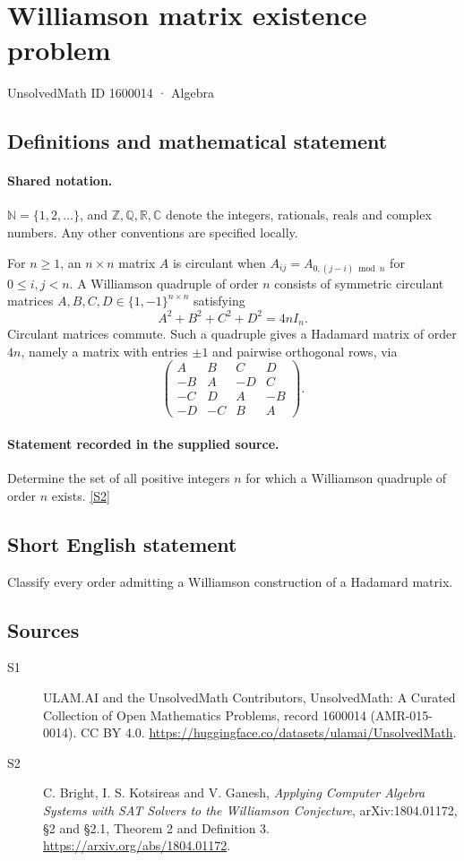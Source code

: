 \documentclass[11pt]{article}
\newcommand{\sref}[2]{\hyperlink{source:#1:#2}{[S#2]}}
\begin{document}
\setcounter{section}{1600013}
\section{Williamson matrix existence problem}\label{1600014}
{\small\sffamily UnsolvedMath ID 1600014 · Algebra}
\subsection{Definitions and mathematical statement}

\paragraph{Shared notation.}$\mathbb N=\{1,2,\ldots\}$, and $\mathbb Z,\mathbb Q,\mathbb R,\mathbb C$ denote the integers, rationals, reals and complex numbers. Any other conventions are specified locally.


For $n\geq1$, an $n\times n$ matrix $A$ is circulant when $A_{ij}=A_{0,(j-i)\bmod n}$ for $0\leq i,j<n$. A Williamson quadruple of order $n$ consists of symmetric circulant matrices $A,B,C,D\in\{1,-1\}^{n\times n}$ satisfying
\[A^2+B^2+C^2+D^2=4nI_n.
\]
Circulant matrices commute. Such a quadruple gives a Hadamard matrix of order $4n$, namely a matrix with entries $\pm1$ and pairwise orthogonal rows, via
\[\begin{pmatrix}A&B&C&D\\-B&A&-D&C\\-C&D&A&-B\\-D&-C&B&A\end{pmatrix}.
\]
\paragraph{Statement recorded in the supplied source.}
Determine the set of all positive integers $n$ for which a Williamson quadruple of order $n$ exists. \sref{1600014}{2}
\subsection{Short English statement}
Classify every order admitting a Williamson construction of a Hadamard matrix.
\subsection{Sources}
\begin{description}
\item[\hypertarget{source:1600014:1}{S1}] ULAM.AI and the UnsolvedMath Contributors, UnsolvedMath: A Curated Collection of Open Mathematics Problems, record 1600014 (AMR-015-0014). CC BY 4.0. \url{https://huggingface.co/datasets/ulamai/UnsolvedMath}.
\item[\hypertarget{source:1600014:2}{S2}] C. Bright, I. S. Kotsireas and V. Ganesh, \emph{Applying Computer Algebra Systems with SAT Solvers to the Williamson Conjecture}, arXiv:1804.01172, §2 and §2.1, Theorem 2 and Definition 3. \url{https://arxiv.org/abs/1804.01172}.
\end{description}
\label{end:1600014}
\end{document}

